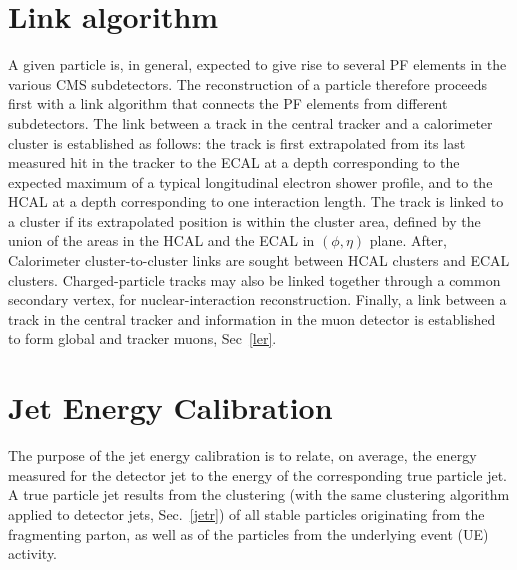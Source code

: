 \section{Link algorithm}
A given particle is, in general, expected to give rise to several PF elements in the various CMS
subdetectors. The reconstruction of a particle therefore proceeds first with a
link algorithm that connects the PF elements from different subdetectors.
The link between a track in the central tracker and a calorimeter cluster is established as follows:
the track is first extrapolated from its last measured hit in the tracker to
the ECAL at a depth corresponding to the expected maximum of a typical longitudinal electron shower
profile, and to the HCAL at a depth corresponding to one interaction length.  
The track is linked to a cluster if its extrapolated position is within the cluster area, defined by the union of the
areas in the HCAL and the ECAL in $(\phi, \eta)$ plane. 
After, Calorimeter cluster-to-cluster links are sought between HCAL clusters and ECAL clusters.
Charged-particle tracks may also be linked together through a common secondary vertex, for
nuclear-interaction reconstruction.
Finally, a link between a track in the central tracker and information in the muon detector is
established to form global and tracker muons, Sec~\ref{ler}.\\


\section{Jet Energy Calibration}
The purpose of the jet energy calibration is to relate, on average, the energy measured for the
detector jet to the energy of the corresponding true particle jet.  A true particle jet results from
the clustering (with the same clustering algorithm applied to detector jets, Sec.~\ref{jetr}) of all stable particles
originating from the fragmenting parton, as well as of the particles from the underlying event
(UE) activity. 

